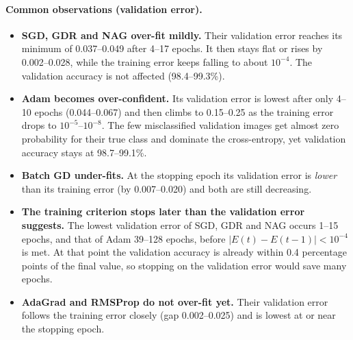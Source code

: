 \documentclass[runningheads]{llncs}
\begin{document}
\paragraph{Common observations (validation error).}
\begin{itemize}
\item \textbf{SGD, GDR and NAG over-fit mildly.} Their validation error reaches its minimum of
0.037--0.049 after 4--17 epochs. It then stays flat or rises by 0.002--0.028, while the training
error keeps falling to about $10^{-4}$. The validation accuracy is not affected (98.4--99.3\%).
\item \textbf{Adam becomes over-confident.} Its validation error is lowest after only 4--10 epochs
(0.044--0.067) and then climbs to 0.15--0.25 as the training error drops to $10^{-5}$--$10^{-8}$.
The few misclassified validation images get almost zero probability for their true class and dominate
the cross-entropy, yet validation accuracy stays at 98.7--99.1\%.
\item \textbf{Batch GD under-fits.} At the stopping epoch its validation error is \emph{lower} than
its training error (by 0.007--0.020) and both are still decreasing.
\item \textbf{The training criterion stops later than the validation error suggests.} The lowest
validation error of SGD, GDR and NAG occurs 1--15 epochs, and that of Adam 39--128 epochs, before
$|E(t)-E(t-1)|<10^{-4}$ is met. At that point the validation accuracy is already within 0.4
percentage points of the final value, so stopping on the validation error would save many epochs.
\item \textbf{AdaGrad and RMSProp do not over-fit yet.} Their validation error follows the training
error closely (gap 0.002--0.025) and is lowest at or near the stopping epoch.
\end{itemize}
\end{document}

